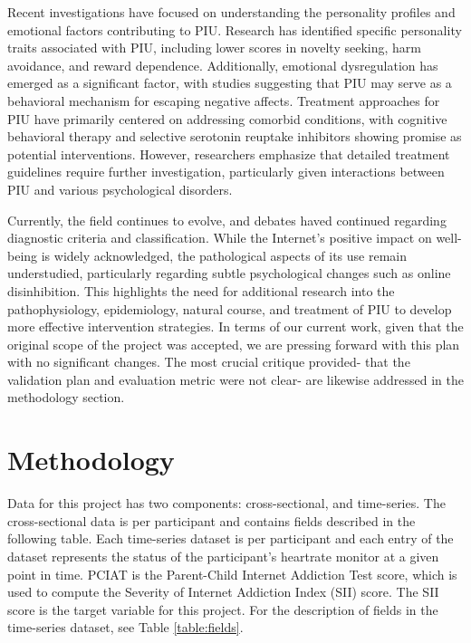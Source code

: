 \documentclass[12pt]{extarticle}
\begin{document}
  Recent investigations have focused on understanding the personality profiles and emotional factors contributing to PIU. Research has identified specific personality traits associated with PIU, including lower scores in novelty seeking, harm avoidance, and reward dependence. 
  Additionally, emotional dysregulation has emerged as a significant factor, with studies suggesting that PIU may serve as a behavioral mechanism for escaping negative affects.
  Treatment approaches for PIU have primarily centered on addressing comorbid conditions, with cognitive behavioral therapy and selective serotonin reuptake inhibitors showing promise as potential interventions.
  However, researchers emphasize that detailed treatment guidelines require further investigation, particularly given interactions between PIU and various psychological disorders.

  Currently, the field continues to evolve, and debates haved continued regarding diagnostic criteria and classification. While the Internet's positive impact on well-being is widely acknowledged, the pathological aspects of its use remain understudied, particularly regarding subtle psychological changes such as online disinhibition. 
  This highlights the need for additional research into the pathophysiology, epidemiology, natural course, and treatment of PIU to develop more effective intervention strategies.
  In terms of our current work, given that the original scope of the project was accepted, we are pressing forward with this plan with no significant changes.
  The most crucial critique provided- that the validation plan and evaluation metric were not clear- are likewise addressed in the methodology section.

\section{Methodology}

  Data for this project has two components: cross-sectional, and time-series. The cross-sectional data is per participant and contains fields described in the following table.
  Each time-series dataset is per participant and each entry of the dataset represents the status of the participant's heartrate monitor at a given point in time. 
  PCIAT is the Parent-Child Internet Addiction Test score, which is used to compute the Severity of Internet Addiction Index (SII) score. 
  The SII score is the target variable for this project. For the description of fields in the time-series dataset, see Table \ref{table:fields}.
\end{document}
